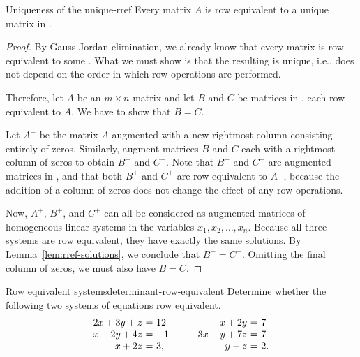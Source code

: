 \begin{theorem}{Uniqueness of the {\rref}}{unique-rref}
  Every matrix $A$ is row equivalent to a unique matrix in {\rref}.
\end{theorem}

\begin{proof}
  By Gauss-Jordan elimination, we already know that every matrix is
  row equivalent to some {\rref}. What we must show is that the
  resulting {\rref} is unique, i.e., does not depend on the order in
  which row operations are performed.

  Therefore, let $A$ be an $m \times n$-matrix and let $B$ and $C$ be
  matrices in {\rref}, each row equivalent to $A$. We have to show
  that $B=C$.

  Let $A^{+}$ be the matrix $A$ augmented with a new rightmost column
  consisting entirely of zeros. Similarly, augment matrices $B$ and
  $C$ each with a rightmost column of zeros to obtain $B^{+}$ and
  $C^{+}$. Note that $B^{+}$ and $C^{+}$ are augmented matrices in
  {\rref}, and that both $B^{+}$ and $C^{+}$ are row equivalent to
  $A^{+}$, because the addition of a column of zeros does not change
  the effect of any row operations.

  Now, $A^{+}$, $B^{+}$, and $C^{+}$ can all be considered as
  augmented matrices of homogeneous linear systems in the variables
  $x_1, x_2,\ldots, x_n$. Because all three systems are row
  equivalent, they have exactly the same solutions. By
  Lemma~\ref{lem:rref-solutions}, we conclude that $B^{+}=C^{+}$.
  Omitting the final column of zeros, we must also have $B=C$.
\end{proof}

\begin{example}{Row equivalent systems}{determinant-row-equivalent}
  Determine whether the following two systems of equations row
  equivalent.
  \begin{equation*}
    \begin{array}{r@{~}c@{~}l}
      2x + 3y + z &=& 12 \\
      x - 2y + 4z &=& -1 \\
      x + 2z &=& 3,
    \end{array}
    \quad\quad
    \begin{array}{r@{~}c@{~}l}
      x + 2y &=& 7 \\
      3x - y + 7z &=& 7 \\
      y - z &=& 2.
    \end{array}
  \end{equation*}
\end{example}

